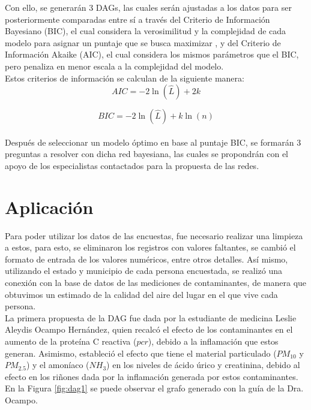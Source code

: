 \documentclass[12pt, letterpaper]{report}
\begin{document}
Con ello, se generarán 3 DAGs, las cuales serán ajustadas a los datos para ser posteriormente comparadas entre sí a través del Criterio de Información Bayesiano (BIC), el cual considera la verosimilitud y la complejidad de cada modelo para asignar un puntaje que se busca maximizar  \cite{scutari2021bayesian}, y del Criterio de Información Akaike (AIC), el cual considera los mismos parámetros que el BIC, pero penaliza en menor escala a la complejidad del modelo.
\\

Estos criterios de información se calculan de la siguiente manera:
\\
\begin{equation}
AIC = -2 \ln(\hat{L}) + 2k
\label{eq:aic}
\end{equation}

\begin{equation}
BIC = -2 \ln(\hat{L}) + k \ln(n)
\label{eq:bic}
\end{equation}
\\
Después de seleccionar un modelo óptimo en base al puntaje BIC, se formarán 3 preguntas a resolver con dicha red bayesiana, las cuales se propondrán con el apoyo de los especialistas contactados para la propuesta de las redes.

\newpage

\section*{Aplicación}

Para poder utilizar los datos de las encuestas, fue necesario realizar una limpieza a estos, para esto, se eliminaron los registros con valores faltantes, se cambió el formato de entrada de los valores numéricos, entre otros detalles. Así mismo, utilizando el estado y municipio de cada persona encuestada, se realizó una conexión con la base de datos de las mediciones de contaminantes, de manera que obtuvimos un estimado de la calidad del aire del lugar en el que vive cada persona.\\

La primera propuesta de la DAG fue dada por la estudiante de medicina Leslie Aleydis Ocampo Hernández, quien recalcó el efecto de los contaminantes en el aumento de la proteína C reactiva ($pcr$), debido a la inflamación que estos generan. Asimismo, estableció el efecto que tiene el material particulado ($PM_{10}$ y $PM_{2.5}$) y el amoníaco ($NH_3$) en los niveles de ácido úrico y creatinina, debido al efecto en los riñones dada por la inflamación generada por estos contaminantes. En la Figura \ref{fig:dag1} se puede observar el grafo generado con la guía de la Dra. Ocampo.
\end{document}
